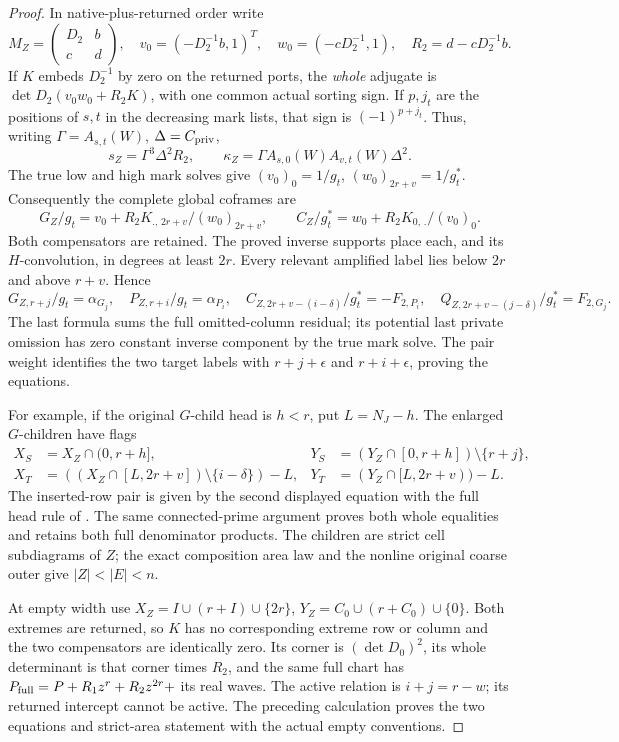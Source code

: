 \documentclass[11pt,a4paper]{amsart}
\numberwithin{equation}{section}
\theoremstyle{plain}
\theoremstyle{definition}
\begin{document}
\begin{proof}
In native-plus-returned order write
\[
 M_Z=\begin{pmatrix}D_2&b\\c&d\end{pmatrix},\quad
 v_0=(-D_2^{-1}b,1)^T,\quad w_0=(-cD_2^{-1},1),
 \quad R_2=d-cD_2^{-1}b.
\]
If \(K\) embeds \(D_2^{-1}\) by zero on the returned ports, the
\emph{whole} adjugate is
\(\det D_2(v_0w_0+R_2K)\), with one common actual sorting sign.
If \(p,j_t\) are the positions of \(s,t\) in the decreasing mark lists,
that sign is \((-1)^{p+j_t}\).  Thus, writing
\(\Gamma=A_{s,t}(W)\), \(\Delta=C_{\rm priv}\),
\[
 s_Z=\Gamma^3\Delta^2R_2,\qquad
 \kappa_Z=\Gamma A_{s,0}(W)A_{v,t}(W)\Delta^2.
\]
The true low and high mark solves give
\((v_0)_0=1/g_t\), \((w_0)_{2r+v}=1/g_t^*\).
Consequently the complete global coframes are
\[
 G_Z/g_t=v_0+R_2K_{.,\,2r+v}/(w_0)_{2r+v},\qquad
 C_Z/g_t^*=w_0+R_2K_{0,\,.}/(v_0)_0.
\]
Both compensators are retained.  The proved inverse supports place each,
and its \(H\)-convolution, in degrees at least \(2r\).
Every relevant amplified label lies below \(2r\) and above \(r+v\).
Hence
\[
 G_{Z,r+j}/g_t=\alpha_{G_j},\quad
 P_{Z,r+i}/g_t=\alpha_{P_i},\quad
 C_{Z,2r+v-(i-\delta)}/g_t^*=-F_{2,P_i},\quad
 Q_{Z,2r+v-(j-\delta)}/g_t^*=F_{2,G_j}.
\]
The last formula sums the full omitted-column residual; its potential
last private omission has zero constant inverse component by the true
mark solve.  The pair weight identifies the two target labels with
\(r+j+\epsilon\) and \(r+i+\epsilon\), proving the equations.

For example, if the original \(G\)-child head is \(h<r\), put
\(L=N_J-h\).  The enlarged \(G\)-children have flags
\[
 \begin{aligned}
 X_S&=X_Z\cap(0,r+h],&
 Y_S&=(Y_Z\cap[0,r+h])\setminus\{r+j\},\\
 X_T&=((X_Z\cap[L,2r+v])\setminus\{i-\delta\})-L,&
 Y_T&=(Y_Z\cap[L,2r+v))-L.
 \end{aligned}
\]
The inserted-row pair is given by the second displayed equation with
the full head rule of .
The same connected-prime argument proves both whole equalities and
retains both full denominator products.  The children are strict cell
subdiagrams of \(Z\); the exact composition area law and the nonline
original coarse outer give \(|Z|<|E|<n\).

At empty width use
\(X_Z=I\cup(r+I)\cup\{2r\}\),
\(Y_Z=C_0\cup(r+C_0)\cup\{0\}\).
Both extremes are returned, so \(K\) has no corresponding extreme
row or column and the two compensators are identically zero.
Its corner is \((\det D_0)^2\), its whole determinant is that corner
times \(R_2\), and the same full chart has
\(P_{\rm full}=P+R_1z^r+R_2z^{2r}+\) its real waves.
The active relation is \(i+j=r-w\); its returned intercept cannot be
active.  The preceding calculation proves the two equations and
strict-area statement with the actual empty conventions.
\end{proof}
\end{document}
